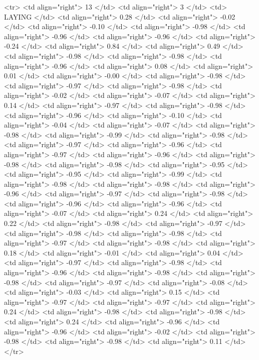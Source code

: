   <tr> <td align="right"> 13 </td> <td align="right">   3 </td> <td> LAYING </td> <td align="right"> 0.28 </td> <td align="right"> -0.02 </td> <td align="right"> -0.10 </td> <td align="right"> -0.98 </td> <td align="right"> -0.96 </td> <td align="right"> -0.96 </td> <td align="right"> -0.24 </td> <td align="right"> 0.84 </td> <td align="right"> 0.49 </td> <td align="right"> -0.98 </td> <td align="right"> -0.98 </td> <td align="right"> -0.96 </td> <td align="right"> 0.08 </td> <td align="right"> 0.01 </td> <td align="right"> -0.00 </td> <td align="right"> -0.98 </td> <td align="right"> -0.97 </td> <td align="right"> -0.98 </td> <td align="right"> -0.02 </td> <td align="right"> -0.07 </td> <td align="right"> 0.14 </td> <td align="right"> -0.97 </td> <td align="right"> -0.98 </td> <td align="right"> -0.96 </td> <td align="right"> -0.10 </td> <td align="right"> -0.04 </td> <td align="right"> -0.07 </td> <td align="right"> -0.98 </td> <td align="right"> -0.99 </td> <td align="right"> -0.98 </td> <td align="right"> -0.97 </td> <td align="right"> -0.96 </td> <td align="right"> -0.97 </td> <td align="right"> -0.96 </td> <td align="right"> -0.98 </td> <td align="right"> -0.98 </td> <td align="right"> -0.95 </td> <td align="right"> -0.95 </td> <td align="right"> -0.99 </td> <td align="right"> -0.98 </td> <td align="right"> -0.98 </td> <td align="right"> -0.96 </td> <td align="right"> -0.97 </td> <td align="right"> -0.98 </td> <td align="right"> -0.96 </td> <td align="right"> -0.96 </td> <td align="right"> -0.07 </td> <td align="right"> 0.24 </td> <td align="right"> 0.22 </td> <td align="right"> -0.98 </td> <td align="right"> -0.97 </td> <td align="right"> -0.98 </td> <td align="right"> -0.98 </td> <td align="right"> -0.97 </td> <td align="right"> -0.98 </td> <td align="right"> 0.18 </td> <td align="right"> -0.01 </td> <td align="right"> 0.04 </td> <td align="right"> -0.97 </td> <td align="right"> -0.98 </td> <td align="right"> -0.96 </td> <td align="right"> -0.98 </td> <td align="right"> -0.98 </td> <td align="right"> -0.97 </td> <td align="right"> -0.08 </td> <td align="right"> -0.03 </td> <td align="right"> 0.15 </td> <td align="right"> -0.97 </td> <td align="right"> -0.97 </td> <td align="right"> 0.24 </td> <td align="right"> -0.98 </td> <td align="right"> -0.98 </td> <td align="right"> 0.24 </td> <td align="right"> -0.96 </td> <td align="right"> -0.96 </td> <td align="right"> -0.02 </td> <td align="right"> -0.98 </td> <td align="right"> -0.98 </td> <td align="right"> 0.11 </td> </tr>
